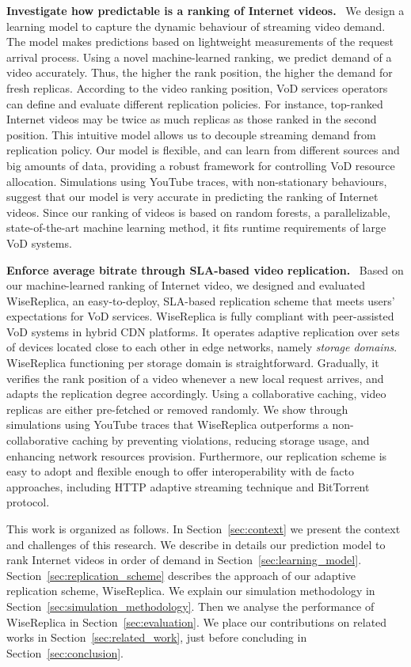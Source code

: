 \noindent
\textbf{Investigate how predictable is a ranking of Internet videos.} \ We design a learning model to capture the dynamic behaviour of streaming video demand. The model makes predictions based on lightweight measurements of the request arrival process. Using a novel machine-learned ranking, we predict demand of a video accurately. Thus, the higher the rank position, the higher the demand for fresh replicas. According to the video ranking position, VoD services operators can define and evaluate different replication policies. For instance, top-ranked Internet videos may be twice as much replicas as those ranked in the second position. This intuitive model allows us to decouple streaming demand from replication policy. Our model is flexible, and can learn from different sources and big amounts of data, providing a robust framework for controlling VoD resource allocation. Simulations using YouTube traces, with non-stationary behaviours, suggest that our model is very accurate in predicting the ranking of Internet videos. Since our ranking of videos is based on random forests, a parallelizable, state-of-the-art machine learning method, it fits runtime requirements of large VoD systems.

\noindent
\textbf{Enforce average bitrate through SLA-based video replication.} \ Based on our machine-learned ranking of Internet video, we designed and evaluated WiseReplica, an easy-to-deploy, SLA-based replication scheme that meets users' expectations for VoD services. WiseReplica is fully compliant with peer-assisted VoD systems in hybrid CDN platforms. It operates adaptive replication over sets of devices located close to each other in edge networks, namely \emph{storage domains}. WiseReplica functioning per storage domain is straightforward. Gradually, it verifies the rank position of a video whenever a new local request arrives, and adapts the replication degree accordingly. Using a collaborative caching, video replicas are either pre-fetched or removed randomly. We show through simulations using YouTube traces that WiseReplica outperforms a non-collaborative caching by preventing violations, reducing storage usage, and enhancing network resources provision. Furthermore, our replication scheme is easy to adopt and flexible enough to offer interoperability with de facto approaches, including HTTP adaptive streaming technique and BitTorrent protocol\cite{bittorrent_P2P_protocol}.


This work is organized as follows. In Section~\ref{sec:context} 
we present the context and challenges of this research. We describe in details our prediction model to rank Internet videos in order of demand in Section~\ref{sec:learning_model}. Section~\ref{sec:replication_scheme} describes the approach of our adaptive replication scheme, WiseReplica. We explain our simulation methodology in Section~\ref{sec:simulation_methodology}. Then we analyse the performance of WiseReplica in Section~\ref{sec:evaluation}. We place our contributions on related works in Section~\ref{sec:related_work}, just before concluding in Section~\ref{sec:conclusion}.
